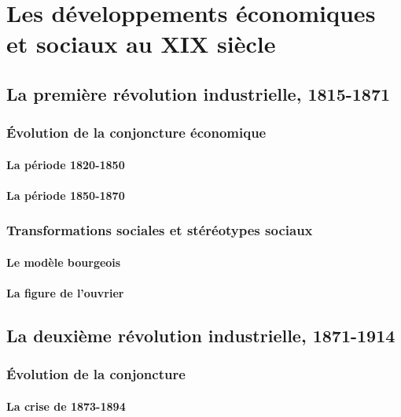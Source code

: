 \documentclass[12pt]{report}
\begin{document}
\chapter{Les développements économiques et sociaux au XIX siècle}

\section{La première révolution industrielle, 1815-1871}

\subsection{Évolution de la conjoncture économique}

\subsubsection{La période 1820-1850}

\subsubsection{La période 1850-1870}

\subsection{Transformations sociales et stéréotypes sociaux}

\subsubsection{Le modèle bourgeois}

\subsubsection{La figure de l'ouvrier}

\section{La deuxième révolution industrielle, 1871-1914}

\subsection{Évolution de la conjoncture}

\subsubsection{La crise de 1873-1894}
\end{document}
